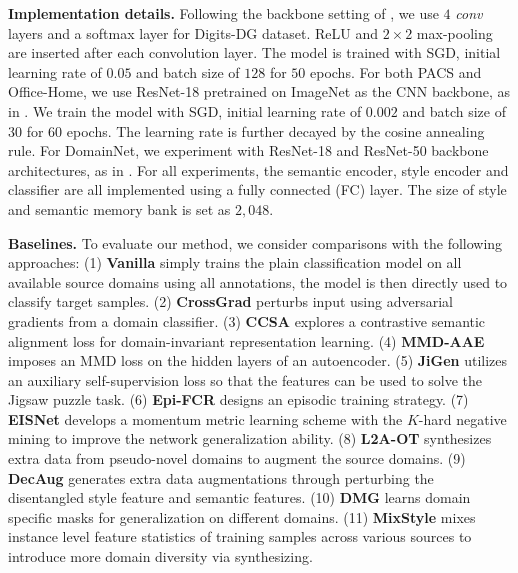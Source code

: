 \documentclass[10pt,twocolumn,letterpaper]{article}
\newcommand{\0}{{\bf 0}}
\begin{document}
\textbf{Implementation details.} Following the backbone setting of \cite{zhou2020learning}, we use $4$ \textit{conv} layers and a softmax layer for Digits-DG dataset. ReLU and $2\times2$ max-pooling are inserted after each convolution layer. The model is trained with SGD, initial learning rate of $0.05$ and batch size of $128$ for $50$ epochs. For both PACS and Office-Home, we use ResNet-18 pretrained on ImageNet as the CNN backbone, as in \cite{zhou2020learning, zhou2021domain}. We train the model with SGD, initial learning rate of $0.002$ and batch size of $30$ for $60$ epochs. The learning rate is further decayed by the cosine annealing rule. For DomainNet, we experiment with ResNet-18 and ResNet-50 backbone architectures, as in \cite{chattopadhyay2020learning}. For all experiments, the semantic encoder, style encoder and classifier are all implemented using a fully connected (FC) layer. The size of style and semantic memory bank is set as $2,048$.

\textbf{Baselines.} To evaluate our method, we consider comparisons with the following approaches: (1) \textbf{Vanilla} simply trains the plain classification model on all available source domains using all annotations, the model is then directly used to classify target samples. (2) \textbf{CrossGrad} \cite{shankar2018generalizing} perturbs input using adversarial gradients from a domain classifier. (3) \textbf{CCSA} \cite{motiian2017unified} explores a contrastive semantic alignment loss for domain-invariant representation learning. (4) \textbf{MMD-AAE} \cite{li2018domain} imposes an MMD loss on the hidden layers of an autoencoder. (5) \textbf{JiGen} \cite{carlucci2019domain} utilizes an auxiliary self-supervision loss so that the features can be used to solve the Jigsaw puzzle task. (6) \textbf{Epi-FCR} \cite{li2019episodic} designs an episodic training strategy. (7) \textbf{EISNet} \cite{wang2020learning} develops a momentum metric learning scheme with the $K$-hard negative mining to improve the network generalization ability.  (8) \textbf{L2A-OT} \cite{zhou2020learning} synthesizes extra data from pseudo-novel domains to augment the source domains. (9) \textbf{DecAug} \cite{bai2020decaug} generates extra data augmentations through perturbing the disentangled style feature and semantic features. (10) \textbf{DMG} \cite{chattopadhyay2020learning} learns domain specific masks for generalization on different domains. (11) \textbf{MixStyle} \cite{zhou2021domain} mixes instance level feature statistics of training samples across various sources to introduce more domain diversity via synthesizing.
\end{document}
